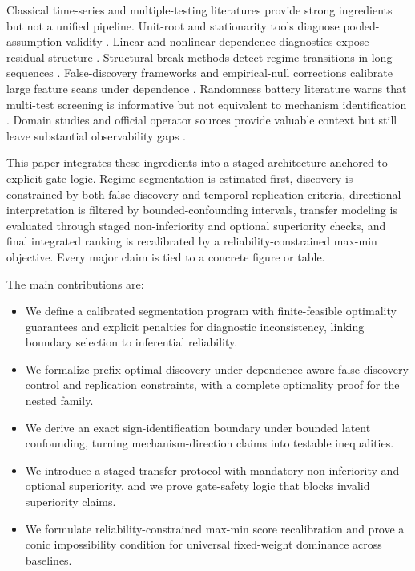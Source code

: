 \documentclass{article} %
\begin{document}
Classical time-series and multiple-testing literatures provide strong ingredients but not a unified pipeline. Unit-root and stationarity tools diagnose pooled-assumption validity \citep{S01,S02,S03,S04}. Linear and nonlinear dependence diagnostics expose residual structure \citep{S05,S06,S07}. Structural-break methods detect regime transitions in long sequences \citep{S08,S09,S10,S11,S12,S13,S14,S27,S28,S37}. False-discovery frameworks and empirical-null corrections calibrate large feature scans under dependence \citep{S15,S16,S17,S18,S19,S25,S26}. Randomness battery literature warns that multi-test screening is informative but not equivalent to mechanism identification \citep{S20,S21,S22,S23,S24,S38}. Domain studies and official operator sources provide valuable context but still leave substantial observability gaps \citep{S29,S30,S34,S35,S36,S39}.

This paper integrates these ingredients into a staged architecture anchored to explicit gate logic. Regime segmentation is estimated first, discovery is constrained by both false-discovery and temporal replication criteria, directional interpretation is filtered by bounded-confounding intervals, transfer modeling is evaluated through staged non-inferiority and optional superiority checks, and final integrated ranking is recalibrated by a reliability-constrained max-min objective. Every major claim is tied to a concrete figure or table.

The main contributions are:
\begin{itemize}
\item We define a calibrated segmentation program with finite-feasible optimality guarantees and explicit penalties for diagnostic inconsistency, linking boundary selection to inferential reliability.
\item We formalize prefix-optimal discovery under dependence-aware false-discovery control and replication constraints, with a complete optimality proof for the nested family.
\item We derive an exact sign-identification boundary under bounded latent confounding, turning mechanism-direction claims into testable inequalities.
\item We introduce a staged transfer protocol with mandatory non-inferiority and optional superiority, and we prove gate-safety logic that blocks invalid superiority claims.
\item We formulate reliability-constrained max-min score recalibration and prove a conic impossibility condition for universal fixed-weight dominance across baselines.
\end{itemize}
\end{document}
